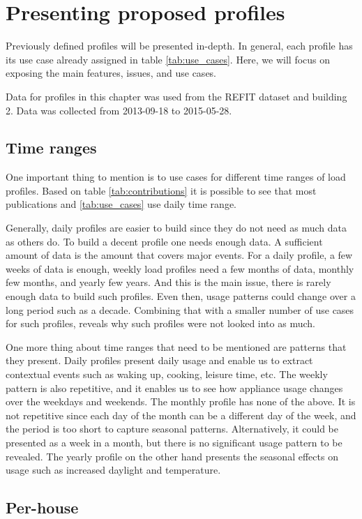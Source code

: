 \label{chapter6}
\chapter{Presenting proposed profiles}

Previously defined profiles will be presented in-depth. 
In general, each profile has its use case already assigned in table \ref{tab:use_cases}.
Here, we will focus on exposing the main features, issues, and use cases. 

Data for profiles in this chapter was used from the REFIT dataset and building 2.
Data was collected from 2013-09-18 to 2015-05-28.
\section{Time ranges}
One important thing to mention is to use cases for different time ranges of load profiles.
Based on table \ref{tab:contributions} it is possible to see that most publications and \ref{tab:use_cases} use daily time range.

Generally, daily profiles are easier to build since they do not need as much data as others do.
To build a decent profile one needs enough data. 
A sufficient amount of data is the amount that covers major events.
For a daily profile, a few weeks of data is enough, weekly load profiles need a few months of data, monthly few months, and yearly few years.
And this is the main issue, there is rarely enough data to build such profiles.
Even then, usage patterns could change over a long period such as a decade.
Combining that with a smaller number of use cases for such profiles, reveals why such profiles were not looked into as much.

One more thing about time ranges that need to be mentioned are patterns that they present.
Daily profiles present daily usage and enable us to extract contextual events such as waking up, cooking, leisure time, etc.
The weekly pattern is also repetitive, and it enables us to see how appliance usage changes over the weekdays and weekends.
The monthly profile has none of the above. It is not repetitive since each day of the month can be a different day of the week, and the period is too short to capture seasonal patterns.
Alternatively, it could be presented as a week in a month, but there is no significant usage pattern to be revealed.
The yearly profile on the other hand presents the seasonal effects on usage such as increased daylight and temperature. 


\section{Per-house}

